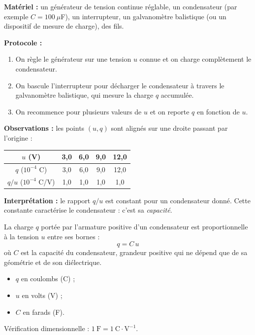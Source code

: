 \documentclass[11pt]{article}
\newcommand{\cle}[1]{{\popxbold\color{popdark}#1}}
\begin{document}
\begin{experience}
\textbf{Matériel :} un générateur de tension continue réglable, un condensateur (par exemple $C = 100~\mu$F), un interrupteur, un galvanomètre balistique (ou un dispositif de mesure de charge), des fils.

\textbf{Protocole :}
\begin{enumerate}
\item On règle le générateur sur une tension $u$ connue et on charge complètement le condensateur.
\item On bascule l'interrupteur pour décharger le condensateur à travers le galvanomètre balistique, qui mesure la charge $q$ accumulée.
\item On recommence pour plusieurs valeurs de $u$ et on reporte $q$ en fonction de $u$.
\end{enumerate}

\textbf{Observations :} les points $(u, q)$ sont alignés sur une droite passant par l'origine :

\begin{center}
\begin{tabular}{|c|c|c|c|c|}
\hline
\rowcolor{popblueL} $u$ (V) & 3,0 & 6,0 & 9,0 & 12,0 \\
\hline
$q$ ($10^{-4}$ C) & 3,0 & 6,0 & 9,0 & 12,0 \\
\hline
$q/u$ ($10^{-4}$ C/V) & 1,0 & 1,0 & 1,0 & 1,0 \\
\hline
\end{tabular}
\end{center}

\textbf{Interprétation :} le rapport $q/u$ est constant pour un condensateur donné. Cette constante caractérise le condensateur : c'est sa \emph{capacité}.
\end{experience}

\begin{propriete}
La charge $q$ portée par l'armature positive d'un condensateur est proportionnelle à la tension $u$ entre ses bornes :
\[ q = C\,u \]
où $C$ est la \cle{capacité} du condensateur, grandeur positive qui ne dépend que de sa géométrie et de son diélectrique.
\begin{itemize}
\item $q$ en coulombs (C) ;
\item $u$ en volts (V) ;
\item $C$ en \cle{farads} (F).
\end{itemize}
Vérification dimensionnelle : $1~\text{F} = 1~\text{C}\cdot\text{V}^{-1}$.
\end{propriete}
\end{document}
